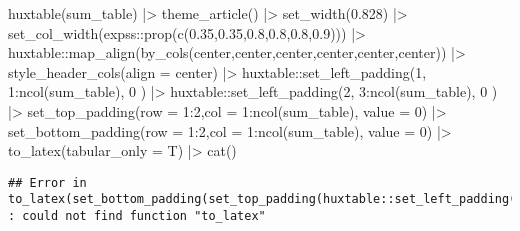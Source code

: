 \documentclass[
]{article}
\newenvironment{Shaded}{\begin{snugshade}}{\end{snugshade}}
\newcommand{\AttributeTok}[1]{\textcolor[rgb]{0.77,0.63,0.00}{#1}}
\newcommand{\DecValTok}[1]{\textcolor[rgb]{0.00,0.00,0.81}{#1}}
\newcommand{\FloatTok}[1]{\textcolor[rgb]{0.00,0.00,0.81}{#1}}
\newcommand{\FunctionTok}[1]{\textcolor[rgb]{0.00,0.00,0.00}{#1}}
\newcommand{\NormalTok}[1]{#1}
\newcommand{\SpecialCharTok}[1]{\textcolor[rgb]{0.00,0.00,0.00}{#1}}
\newcommand{\StringTok}[1]{\textcolor[rgb]{0.31,0.60,0.02}{#1}}
\begin{document}
\begin{minipage}[t]{0.7\linewidth}
\begin{Shaded}
\begin{Highlighting}[]
\FunctionTok{huxtable}\NormalTok{(sum\_table) }\SpecialCharTok{|\textgreater{}} \FunctionTok{theme\_article}\NormalTok{() }\SpecialCharTok{|\textgreater{}} \FunctionTok{set\_width}\NormalTok{(}\FloatTok{0.828}\NormalTok{) }\SpecialCharTok{|\textgreater{}}
\FunctionTok{set\_col\_width}\NormalTok{(expss}\SpecialCharTok{::}\FunctionTok{prop}\NormalTok{(}\FunctionTok{c}\NormalTok{(}\FloatTok{0.35}\NormalTok{,}\FloatTok{0.35}\NormalTok{,}\FloatTok{0.8}\NormalTok{,}\FloatTok{0.8}\NormalTok{,}\FloatTok{0.8}\NormalTok{,}\FloatTok{0.9}\NormalTok{))) }\SpecialCharTok{|\textgreater{}}
\NormalTok{huxtable}\SpecialCharTok{::}\FunctionTok{map\_align}\NormalTok{(}\FunctionTok{by\_cols}\NormalTok{(}\StringTok{\textquotesingle{}center\textquotesingle{}}\NormalTok{,}\StringTok{\textquotesingle{}center\textquotesingle{}}\NormalTok{,}\StringTok{\textquotesingle{}center\textquotesingle{}}\NormalTok{,}\StringTok{\textquotesingle{}center\textquotesingle{}}\NormalTok{,}\StringTok{\textquotesingle{}center\textquotesingle{}}\NormalTok{,}\StringTok{\textquotesingle{}center\textquotesingle{}}\NormalTok{)) }\SpecialCharTok{|\textgreater{}}
\FunctionTok{style\_header\_cols}\NormalTok{(}\AttributeTok{align =} \StringTok{\textquotesingle{}center\textquotesingle{}}\NormalTok{)  }\SpecialCharTok{|\textgreater{}}
\NormalTok{huxtable}\SpecialCharTok{::}\FunctionTok{set\_left\_padding}\NormalTok{(}\DecValTok{1}\NormalTok{, }\DecValTok{1}\SpecialCharTok{:}\FunctionTok{ncol}\NormalTok{(sum\_table), }\DecValTok{0}\NormalTok{ ) }\SpecialCharTok{|\textgreater{}}
\NormalTok{huxtable}\SpecialCharTok{::}\FunctionTok{set\_left\_padding}\NormalTok{(}\DecValTok{2}\NormalTok{, }\DecValTok{3}\SpecialCharTok{:}\FunctionTok{ncol}\NormalTok{(sum\_table), }\DecValTok{0}\NormalTok{ ) }\SpecialCharTok{|\textgreater{}}
               \FunctionTok{set\_top\_padding}\NormalTok{(}\AttributeTok{row =} \DecValTok{1}\SpecialCharTok{:}\DecValTok{2}\NormalTok{,}\AttributeTok{col =} \DecValTok{1}\SpecialCharTok{:}\FunctionTok{ncol}\NormalTok{(sum\_table), }\AttributeTok{value =} \DecValTok{0}\NormalTok{) }\SpecialCharTok{|\textgreater{}}
               \FunctionTok{set\_bottom\_padding}\NormalTok{(}\AttributeTok{row =} \DecValTok{1}\SpecialCharTok{:}\DecValTok{2}\NormalTok{,}\AttributeTok{col =} \DecValTok{1}\SpecialCharTok{:}\FunctionTok{ncol}\NormalTok{(sum\_table), }\AttributeTok{value =} \DecValTok{0}\NormalTok{) }\SpecialCharTok{|\textgreater{}}
\FunctionTok{to\_latex}\NormalTok{(}\AttributeTok{tabular\_only =}\NormalTok{ T) }\SpecialCharTok{|\textgreater{}} \FunctionTok{cat}\NormalTok{()}
\end{Highlighting}
\end{Shaded}

\begin{verbatim}
## Error in to_latex(set_bottom_padding(set_top_padding(huxtable::set_left_padding(huxtable::set_left_padding(style_header_cols(huxtable::map_align(set_col_width(set_width(theme_article(huxtable(sum_table)), : could not find function "to_latex"
\end{verbatim}

\end{minipage}
\end{document}
